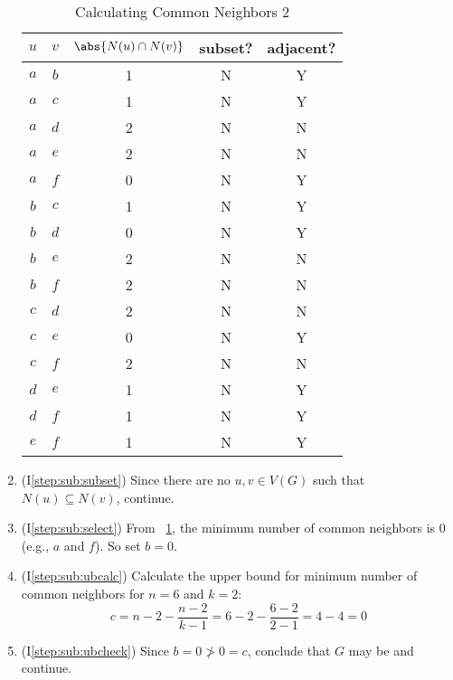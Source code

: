 \begin{enumerate}
  \begin{table}[H]
    \centering
    \caption{Calculating Common Neighbors 2}
    \label{tab:common2}
    \begin{tabular}{|c|c|c|c|c|}
      \hline
      \(u\) & \(v\) & \(\abs{N(u)\cap N(v)}\) & subset? & adjacent? \\
      \hline
      \(a\) & \(b\) & 1 & N & Y \\
      \hline
      \(a\) & \(c\) & 1 & N & Y \\
      \hline
      \(a\) & \(d\) & 2 & N & N \\
      \hline
      \(a\) & \(e\) & 2 & N & N \\
      \hline
      \(a\) & \(f\) & 0 & N & Y \\
      \hline
      \(b\) & \(c\) & 1 & N & Y \\
      \hline
      \(b\) & \(d\) & 0 & N & Y \\
      \hline
      \(b\) & \(e\) & 2 & N & N \\
      \hline
      \(b\) & \(f\) & 2 & N & N \\
      \hline
      \(c\) & \(d\) & 2 & N & N \\
      \hline
      \(c\) & \(e\) & 0 & N & Y \\
      \hline
      \(c\) & \(f\) & 2 & N & N \\
      \hline
      \(d\) & \(e\) & 1 & N & Y \\
      \hline
      \(d\) & \(f\) & 1 & N & Y \\
      \hline
      \(e\) & \(f\) & 1 & N & Y \\
      \hline
    \end{tabular}
  \end{table}

\item (I\ref{step:sub:subset}) Since there are no \(u,v\in V(G)\) such that \(N(u)\subseteq N(v)\), continue.

\item (I\ref{step:sub:select}) From \tablename~\ref{tab:common2}, the minimum number of common neighbors is 0
  (e.g., \(a\) and \(f\)).  So set \(b=0\).

\item (I\ref{step:sub:ubcalc}) Calculate the upper bound for minimum number of common neighbors for \(n=6\) and
  \(k=2\):
  \[c=n-2-\frac{n-2}{k-1}=6-2-\frac{6-2}{2-1}=4-4=0\]

\item (I\ref{step:sub:ubcheck}) Since \(b=0\ngtr0=c\), conclude that \(G\) may be  and continue.


\end{enumerate}
